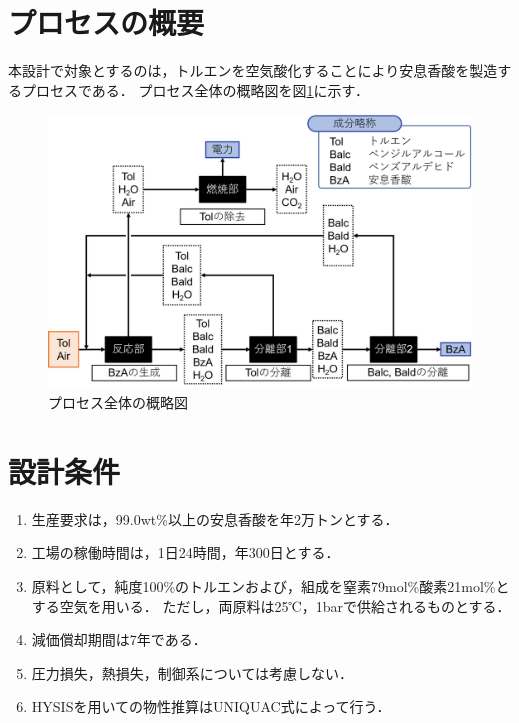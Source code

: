\documentclass[a4j]{jsreport}
\begin{document}
\section{プロセスの概要}
本設計で対象とするのは，トルエンを空気酸化することにより安息香酸を製造するプロセスである．
プロセス全体の概略図を図\ref{プロセス全体のの概略図}に示す．
\begin{figure}[htbp]
  \centering
  \includegraphics[scale=0.6]{processOutline.png}
  \caption{プロセス全体の概略図}
  \label{プロセス全体のの概略図}
\end{figure}

\section{設計条件}
\begin{enumerate}
  \item 生産要求は，99.0wt\%以上の安息香酸を年2万トンとする．\\
  \item 工場の稼働時間は，1日24時間，年300日とする．\\
  \item 原料として，純度100\%のトルエンおよび，組成を窒素79mol\%酸素21mol\%とする空気を用いる．
           ただし，両原料は25℃，1barで供給されるものとする．\\
  \item 減価償却期間は7年である．\\
  \item 圧力損失，熱損失，制御系については考慮しない．\\
  \item HYSISを用いての物性推算はUNIQUAC式によって行う．
\end{enumerate}
\end{document}
